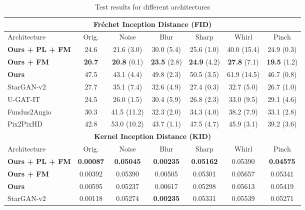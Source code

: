 \documentclass[a4paper,conference]{IEEEtran}
\begin{document}
\begin{table*}[ht]
\centering

\caption{Test results for different architectures}
\begin{adjustbox}{width=5.8in,totalheight=2.8in}
\begin{threeparttable}
    \begin{tabular}{|l|c|c|c|c|c|c|} 
    \hline
    \multicolumn{7}{|c|}{\textbf{Fréchet Inception Distance (FID)}}\\
    \hline
    Architecture &  Orig. &  Noise & Blur &  Sharp & Whirl & Pinch \\
    \hline
    \textbf{Ours + PL\tnote{1} + FM\tnote{2}} & 24.6 &  21.6 (3.0) &  30.0 (5.4) &  25.6 (1.0) &  40.0 (15.4) &  24.9 (0.3) \\
    \textbf{Ours + FM\tnote{2}} & \textbf{20.7} &  \textbf{20.8 }(0.1) &  \textbf{23.5} (2.8) &  \textbf{24.9} (4.2) & \textbf{27.8} (7.1) &  \textbf{19.5} (1.2) \\
    \textbf{Ours} & 47.5 &  43.1 (4.4) &  49.8 (2.3) &  50.5 (3.5) &  61.9 (14.5) &  46.7 (0.8) \\ 
    StarGAN-v2 \cite{choi2020stargan} & 27.7 & 35.1 (7.4) & 32.6 (4.9) & 27.4 (0.3) & 32.7 (5.0) & 26.7 (1.0) \\
    U-GAT-IT \cite{kim2019u} & 24.5 & 26.0 (1.5) & 30.4 (5.9)  & 26.8 (2.3) & 33.0 (9.5) & 29.1 (4.6) \\
    Fundus2Angio \cite{kamran2020fundus2angio} & 30.3 &  41.5 (11.2) & 32.3 (2.0) & 34.3 (4.0) & 38.2 (7.9) & 33.1 (2.8) \\ 
    Pix2PixHD \cite{wang2018high} & 42.8  & 53.0 (10.2)& 43.7 (1.1) & 47.5 (4.7) & 45.9 (3.1) & 39.2 (3.6) \\ 
    \hline
    \hline
    \multicolumn{7}{|c|}{\textbf{Kernel Inception Distance (KID)}}\\
    \hline
    Architecture &  Orig. &  Noise & Blur &  Sharp & Whirl & Pinch \\
    \hline
    \textbf{Ours + PL\tnote{1} + FM\tnote{2}} & \textbf{0.00087} & \textbf{0.05045} & \textbf{0.00235} & \textbf{0.05162} & 0.05390 & \textbf{0.04575} \\
    \textbf{Ours + FM\tnote{2}} & 0.00392 &	0.05390 & 0.00505 & 0.05301 & 0.05657	& 0.05341 \\
    \textbf{Ours} & 0.00595 & 0.05237 &	0.00617 & 0.05298 &	0.05613 & 0.05419 \\
    StarGAN-v2 \cite{choi2020stargan} & 0.00118 & 0.05274 & \textbf{0.00235} & 0.05331 & 0.05539 & 0.05271 \\

\end{tabular}
\end{threeparttable}
\end{adjustbox}
\end{table*}
\end{document}

